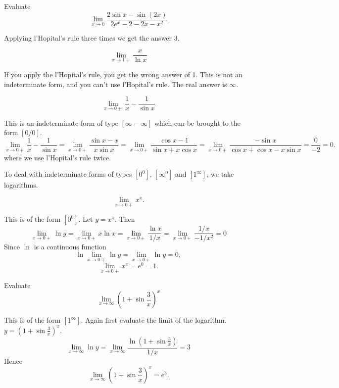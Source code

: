\documentclass[../calc1-main.tex]{subfiles}
\begin{document}
\begin{example}
  Evaluate
  \[
    \lim_{x \to 0} \frac{2\sin x-\sin(2x)}{2e^x-2-2x-x^2}
  \]
\end{example}
\begin{solution}
  Applying l'Hopital's rule three times we get the answer $3$.
\end{solution}

\begin{example}
  \[
    \lim_{x \to 1+} \frac{x}{\ln x}
  \]
\end{example}
\begin{solution}
  If you apply the l'Hopital's rule, you get the wrong answer of 1. This is not an indeterminate form, and you can't use l'Hopital's rule. The real answer is $\infty$.
\end{solution}

\begin{example}
  \[
    \lim_{x \to 0+} \frac{1}{x} - \frac{1}{\sin x}
  \]
\end{example}
\begin{solution}
  This is an indeterminate form of type $[ \infty - \infty]$ which can be brought to the form $[0/0]$.
  \[
    \lim_{x \to 0+} \frac{1}{x} - \frac{1}{\sin x} =
    \lim_{x \to 0+} \frac{\sin x - x}{x \sin x} =
    \lim_{x \to 0+} \frac{\cos x - 1}{\sin x + x \cos x} =
    \lim_{x \to 0+} \frac{-\sin x}{\cos x + \cos x - x \sin x} = \frac{0}{-2} =0.
  \]
  where we use l'Hopital's rule twice.
\end{solution}

To deal with indeterminate forms of types $[0^0]$, $[\infty^0]$ and $[1^{\infty}]$, we take logarithms.

\begin{example}
  \[
    \lim_{x \to 0+} x^x.
  \]
\end{example}
\begin{solution}
  This is of the form $[0^0]$. Let $y= x^x$. Then
  \[
    \lim_{x \to 0+} \ln y = \lim_{x \to 0+} x \ln x = \lim_{x \to 0+} \frac{\ln x}{1/x}
    = \lim_{x \to 0+} \frac{1/x}{-1/x^2} = 0
  \]
  Since $\ln$ is a continuous function
  \[
    \ln \lim_{x \to 0+} \ln y = \lim_{x \to 0+} \ln y = 0,
  \]
  \[
    \lim_{x \to 0+} x^x = e^0 = 1.
  \]
\end{solution}

\begin{example}
  Evaluate
  \[
    \lim_{x \to \infty} \left( 1+ \sin \frac{3}{x} \right)^x
  \]
\end{example}
\begin{solution}
  This is of the form $[1^{\infty}]$. Again first evaluate the limit of the logarithm. $y=\left( 1+ \sin \frac{3}{x} \right)^x$.
  \[
    \lim_{x \to \infty} \ln y =
    \lim_{x \to \infty} \frac{\ln \left( 1+ \sin \frac{3}{x} \right)}{1/x} = 3
  \]
  Hence
  \[
    \lim_{x \to \infty} \left( 1+ \sin \frac{3}{x} \right)^x = e^3.
  \]
\end{solution}
\end{document}
